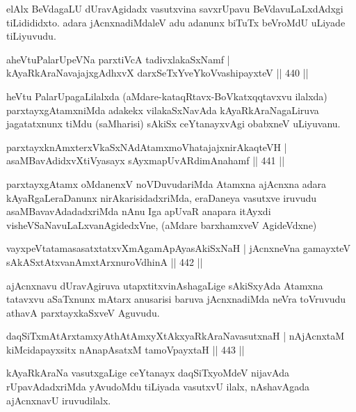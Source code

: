 \begin{artha}
elAlx BeVdagaLU dUravAgidadx vasutxvina savxrUpavu BeVdavuLaLxdAdxgi
tiLidididxto. adara jAcnxnadiMdaleV adu adanunx biTuTx beVroMdU uLiyade tiLiyuvudu.
\end{artha}

\begin{shl}
aheVtuPalarUpeVNa parxtiVcA tadivxlakaSxNamf |
kAyaRkAraNavajajxgAdhxvX darxSeTxYveYkoV\s vashipayxteV \hfill || 440 ||
\end{shl}

\begin{artha}
heVtu PalarUpagaLilalxda (aMdare-kataqRtavx-BoVkatxqqtavxvu ilalxda) parxtayxgAtamxniMda adakekx vilakaSxNavAda kAyaRkAraNagaLiruva jagatatxnunx tiMdu (saMharisi) sAkiSx ceYtanayxvAgi obabxneV uLiyuvanu.
\end{artha}

\begin{shl}
parxtayxknAmxterxVkaSxNAdAtamxmoVhatajajxnirAkaqteVH |
asaMBavAdidxvXtiVyasayx sAyxmapUvARdimAnahamf \hfill || 441 ||
\end{shl}

\begin{artha}
parxtayxgAtamx oMdanenxV noVDuvudariMda Atamxna ajAcnxna adara
kAyaRgaLeraDanunx nirAkarisidadxriMda, eraDaneya vasutxve iruvudu
asaMBavavAdadadxriMda nAnu Iga apUvaR anapara itAyxdi
visheVSaNavuLaLxvanAgidedxVne, (aMdare barxhamxveV AgideVdxne) 
\end{artha}

\begin{shl}
vayxpeVtatamasasatxtatxvXmAgamApAyasAkiSxNaH |
jAcnxneVna gamayxteV sAkASxtAtxvanAmxtArxnuroVdhinA \hfill || 442 ||
\end{shl}

\begin{artha}
ajAcnxnavu dUravAgiruva utapxtitxvinAshagaLige sAkiSxyAda Atamxna tatavxvu aSaTxnunx mAtarx anusarisi baruva jAcnxnadiMda neVra toVruvudu athavA parxtayxkaSxveV Aguvudu.
\end{artha}

\begin{shl}
daqSiTxmAtArxtamxyAthAtAmxyXtAkxyaRkAraNavasutxnaH |
nAjAcnxtaM kiMcidapayxsitx nAnapAsatxM tamoV\s payxtaH \hfill || 443 ||
\end{shl}

\begin{artha}
kAyaRkAraNa vasutxgaLige ceYtanayx daqSiTxyoMdeV nijavAda rUpavAdadxriMda yAvudoMdu tiLiyada vasutxvU ilalx, nAshavAgada ajAcnxnavU iruvudilalx.
\end{artha}

